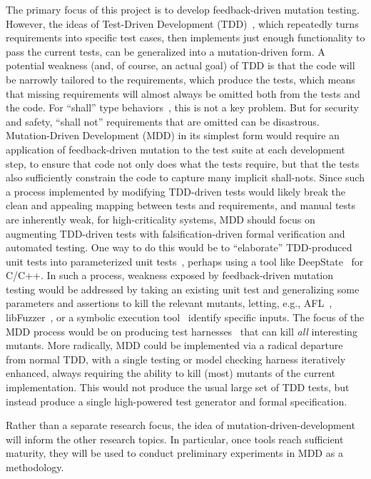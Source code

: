 The primary focus of this project is to develop feedback-driven mutation
testing.  However, the ideas of Test-Driven Development
(TDD)~\cite{TDD,TDDFuture}, which repeatedly turns requirements into specific
test cases, then implements just enough functionality to pass the current tests,
can be generalized into a mutation-driven form.  A potential weakness (and, of
course, an actual goal) of TDD is that the code will be narrowly tailored to the
requirements, which produce the tests, which means that missing requirements
will almost always be omitted both from the tests and the code.  For ``shall''
type behaviors~\cite{INCOSE}, this is not a key problem.  But for security and
safety, ``shall not'' requirements that are omitted can be disastrous.
Mutation-Driven Development (MDD) in its simplest form would require an
application of feedback-driven mutation to the test suite at each development
step, to ensure that code not only does what the tests require, but that the
tests also sufficiently constrain the code to capture many implicit shall-nots.
Since such a process implemented by modifying TDD-driven tests would likely
break the clean and appealing mapping between tests and requirements, and manual
tests are inherently weak, for high-criticality systems, MDD should focus on
augmenting TDD-driven tests with falsification-driven formal verification and
automated testing.  One way to do this would be to ``elaborate'' TDD-produced
unit tests into parameterized unit tests~\cite{UnitMeister,ParamUnit}, perhaps
using a tool like DeepState~\cite{DeepState} for C/C++.  In such a process,
weakness exposed by feedback-driven mutation testing would be addressed by
taking an existing unit test and generalizing some parameters and assertions to
kill the relevant mutants, letting, e.g., AFL~\cite{aflfuzz},
libFuzzer~\cite{libfuzzer}, or a symbolic execution
tool~\cite{angr1,angr2,manticore} identify specific inputs.  The focus of the
MDD process would be on producing test harnesses~\cite{WODACommon,tstlsttt} that
can kill \emph{all} interesting mutants.  More radically, MDD could
be implemented via a radical departure from normal TDD, with a single testing or
model checking harness iteratively enhanced, always requiring the ability to kill (most) mutants of
the current implementation.  This would not produce the usual large set of TDD
tests, but instead produce a single high-powered test generator and formal
specification.

Rather than a separate research focus, the idea of
mutation-driven-development will inform the other
research topics.  In particular, once tools
reach sufficient maturity, they will be used to conduct preliminary
experiments in MDD as a methodology.  %


